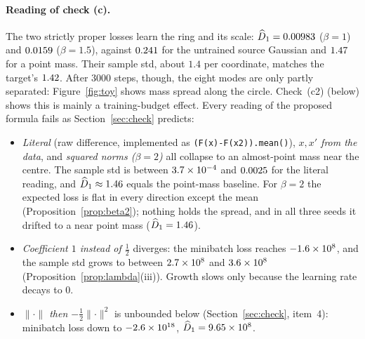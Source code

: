 \documentclass[11pt]{article}
\theoremstyle{definition}
\theoremstyle{remark}
\newcommand{\norm}[1]{\lVert #1\rVert}
\begin{document}
\paragraph{Reading of check (c).} The two strictly proper losses learn the ring and its scale:
$\widehat D_1=0.00983$ ($\beta=1$) and $0.0159$ ($\beta=1.5$), against $0.241$ for
the untrained source Gaussian and $1.47$ for a point mass. Their sample std, about $1.4$ per
coordinate, matches the target's $1.42$. After $3000$ steps, though, the eight modes are only
partly separated: Figure~\ref{fig:toy} shows mass spread along the circle. Check~(c2) (below) shows this is
mainly a training-budget effect. Every reading of the proposed formula fails as Section~\ref{sec:check}
predicts:
\begin{itemize}
\item \emph{Literal} (raw difference, implemented as \texttt{(F(x)-F(x2)).mean()}), \emph{$x,x'$ from the
data}, and \emph{squared norms ($\beta=2$)} all collapse to an almost-point mass near the centre. The sample
std is between $3.7\times10^{-4}$ and $0.0025$ for the literal reading, and
$\widehat D_1\approx1.46$ equals the point-mass baseline. For $\beta=2$ the expected loss is
flat in every direction except the mean (Proposition~\ref{prop:beta2}); nothing holds the spread, and in all
three seeds it drifted to a near point mass ($\widehat D_1=1.46$).
\item \emph{Coefficient $1$ instead of $\tfrac12$} diverges: the minibatch loss reaches
$-1.6\times10^{8}$, and the sample std grows to between $2.7\times10^{8}$ and $3.6\times10^{8}$
(Proposition~\ref{prop:lambda}(iii)). Growth slows only because the learning rate decays to $0$.
\item \emph{$\norm{\cdot}$ then $-\tfrac12\norm{\cdot}^2$} is unbounded below
(Section~\ref{sec:check}, item~4): minibatch loss down to $-2.6\times10^{18}$, $\widehat D_1=9.65\times10^{8}$.
\end{itemize}
\end{document}
